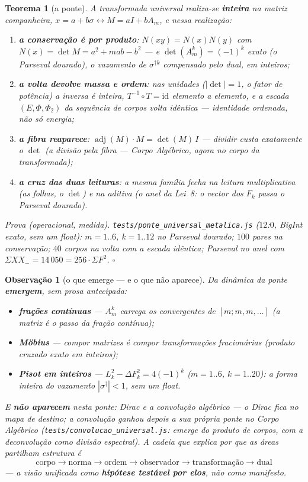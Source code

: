 \documentclass[11pt,a4paper]{article}
\newtheorem{teorema}{Teorema}
\newtheorem{observacao}{Observação}
\newcommand{\code}[1]{\texttt{#1}}
\begin{document}
\begin{teorema}[a ponte]\label{thm:ponte-universal}
A transformada universal realiza-se \textbf{inteira} na matriz
companheira, $x=a+b\sigma\leftrightarrow M=aI+bA_m$, e nessa realização:
\begin{enumerate}
\item \textbf{a conservação é por produto}:
$N(xy)=N(x)N(y)$ com $N(x)=\det M=a^{2}+mab-b^{2}$ --- e
$\det(A_m^{k})=(-1)^{k}$ exato (o Parseval dourado), o vazamento de
$\sigma^{\dagger k}$ compensado pelo dual, em inteiros;
\item \textbf{a volta devolve massa e ordem}: nas unidades ($|\det|=1$,
o fator de potência) a inversa é inteira, $T^{-1}\!\circ T=\mathrm{id}$
elemento a elemento, e a escada $(E,\Phi,\Phi_2)$ da sequência de corpos
volta \emph{idêntica} --- identidade ordenada, não só energia;
\item \textbf{a fibra reaparece}: $\operatorname{adj}(M)\cdot M=\det(M)\,I$
--- dividir custa exatamente o $\det$ (a divisão pela fibra ---
\emph{Corpo Algébrico}, agora no corpo da transformada);
\item \textbf{a cruz das duas leituras}: a mesma família fecha na
leitura multiplicativa (as folhas, o $\det$) e na aditiva (o anel da
Lei~8: o vector dos $F_k$ passa o Parseval dourado).
\end{enumerate}
\emph{Prova (operacional, medida).} \code{tests/ponte\_universal\_metalica.js}
($12$:$0$, BigInt exato, sem um float): $m=1..6$, $k=1..12$ no
Parseval dourado; $100$ pares na conservação; $40$ corpos na volta com
a escada idêntica; Parseval no anel com
$\Sigma XX_{-}=14\,050=256\cdot\Sigma F^{2}$. $\square$
\end{teorema}

\begin{observacao}[o que emerge --- e o que não aparece]\label{obs:emerge}
Da dinâmica da ponte \textbf{emergem}, sem prosa antecipada:
\begin{itemize}
\item \textbf{frações contínuas} --- $A_m^{k}$ \emph{carrega} os
convergentes de $[m;m,m,\ldots]$ (a matriz é o passo da fração
contínua);
\item \textbf{Möbius} --- compor matrizes é compor transformações
fracionárias (produto cruzado exato em inteiros);
\item \textbf{Pisot em inteiros} --- $L_k^{2}-\Delta F_k^{2}=4(-1)^{k}$
($m=1..6$, $k=1..20$): a forma inteira do vazamento $|\sigma^{\dagger}|<1$,
sem um float.
\end{itemize}
E \textbf{não aparecem} nesta ponte: Dirac e a convolução algébrico ---
o Dirac fica no \emph{mapa de destino}; a convolução ganhou depois a
sua própria ponte no \emph{Corpo Algébrico}
(\code{tests/convolucao\_universal.js}: emerge do produto de corpos,
com a deconvolução como divisão espectral).
A cadeia que explica por que as áreas partilham estrutura é
\[
\boxed{
\text{corpo}\to\text{norma}\to\text{ordem}\to\text{observador}
\to\text{transformação}\to\text{dual}
}
\]
--- a visão unificada como \textbf{hipótese testável por elos}, não como
manifesto.
\end{observacao}
\end{document}
